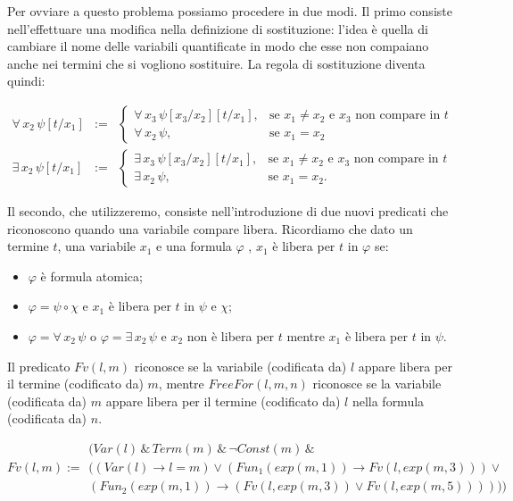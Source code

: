 Per ovviare a questo problema possiamo procedere in due modi. Il primo consiste nell'effettuare una modifica nella definizione di sostituzione: l'idea \`e quella di cambiare il nome delle variabili quantificate in modo che esse non compaiano anche nei termini che si vogliono sostituire. La regola di sostituzione diventa quindi:

\begin{eqnarray*}
 \forall\, x_2\, \psi [t/x_1]  &:=&    \left \{ \begin{array}{ll}
\forall\, x_3\, \psi [x_3/x_2] [t/x_1], & \textrm{se $x_1 \ne x_2$ e $x_3$ non compare in $t$}\\
\forall\, x_2\, \psi, & \textrm{se $x_1 = x_2$}
\end{array}\right.\\
\exists\, x_2\, \psi [t/x_1]  &:=& \left \{ \begin{array}{ll}
\exists\, x_3\, \psi [x_3/x_2] [t/x_1], & \textrm{se $x_1 \ne x_2$ e $x_3$ non compare in $t$}\\
\exists\, x_2\, \psi, & \textrm{se $x_1 = x_2$}.
\end{array}\right.
\end{eqnarray*}

Il secondo, che utilizzeremo, consiste nell'introduzione di due nuovi pre\-di\-ca\-ti che riconoscono quando una variabile compare libera. Ricordiamo che dato un termine $t$, una variabile $x_1$ e una formula $\varphi$ , $x_1$ \`e libera per $t$ in $\varphi$ se:
\begin{itemize}
 \item $\varphi$ \`e formula atomica;
\item $\varphi=\psi\circ \chi$ e $x_1$ \`e libera per $t$ in $\psi$ e $\chi$;
\item $\varphi=\forall \,x_2\, \psi$ o $\varphi=\exists \,x_2\, \psi$ e $x_2$ non \`e libera per $t$ mentre $x_1$ \`e libera per $t$ in $\psi$.
\end{itemize}

Il predicato $Fv(l, m)$ riconosce se la variabile (codificata da) $l$ appare libera per il termine (codificato da) $m$, mentre $FreeFor(l,m,n)$ riconosce se la variabile (codificata da) $m$ appare libera per il termine (codificato da) $l$ nella formula (codificata da) $n$.

{\tiny
\begin{displaymath}
Fv(l,m) := \left. \begin{array}{l}(Var(l) \,\&\, Term(m) \,\&\, \neg Const(m) \,\&\, \\
((Var(l)\rightarrow l=m) \vee (Fun_1(exp(m,1))\rightarrow Fv(l,exp(m,3))) \vee \\
(Fun_2(exp(m,1))\rightarrow (Fv(l,exp(m,3))\vee Fv(l,exp(m,5))))
)) 
\end{array} \right.
\end{displaymath}}

